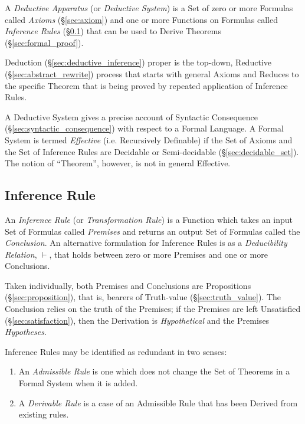 A \emph{Deductive Apparatus} (or \emph{Deductive System}) is a Set of
zero or more Formulas called \emph{Axioms} (\S\ref{sec:axiom}) and one or
more Functions on Formulas called \emph{Inference Rules}
(\S\ref{sec:inference_rule}) that can be used to Derive Theorems
(\S\ref{sec:formal_proof}).

Deduction (\S\ref{sec:deductive_inference}) proper is the top-down,
Reductive (\S\ref{sec:abstract_rewrite}) process that starts with
general Axioms and Reduces to the specific Theorem that is being
proved by repeated application of Inference Rules.

A Deductive System gives a precise account of Syntactic Consequence
(\S\ref{sec:syntactic_consequence}) with respect to a Formal Language.
A Formal System is termed \emph{Effective} (i.e. Recursively
Definable) if the Set of Axioms and the Set of Inference Rules are
Decidable or Semi-decidable (\S\ref{sec:decidable_set}). The notion of
``Theorem'', however, is not in general Effective.



\subsection{Inference Rule}\label{sec:inference_rule}

An \emph{Inference Rule} (or \emph{Transformation Rule}) is a Function which
takes an input Set of Formulas called \emph{Premises} and returns an output Set
of Formulas called the \emph{Conclusion}. An alternative formulation for
Inference Rules is as a \emph{Deducibility Relation}, $\vdash$, that holds
between zero or more Premises and one or more Conclusions.

Taken individually, both Premises and Conclusions are Propositions
(\S\ref{sec:proposition}), that is, bearers of Truth-value
(\S\ref{sec:truth_value}). The Conclusion relies on the truth of the Premises;
if the Premises are left Unsatisfied (\S\ref{sec:satisfaction}), then the
Derivation is \emph{Hypothetical} and the Premises \emph{Hypotheses}.

Inference Rules may be identified as redundant in two senses:
\begin{enumerate}
  \item An \emph{Admissible Rule} is one which does not change the Set
    of Theorems in a Formal System when it is added.
  \item A \emph{Derivable Rule} is a case of an Admissible Rule that
    has been Derived from existing rules.
\end{enumerate}



